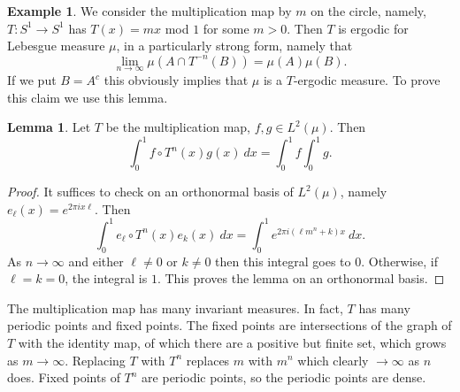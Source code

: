 \documentclass[12pt]{report}
\theoremstyle{definition}
\newtheorem{lemma}[theorem]{Lemma}
\newtheorem{example}[theorem]{Example}
\begin{document}
\begin{example}
We consider the multiplication map by $m$ on the circle, namely, $T: S^1 \to S^1$ has $T(x) = mx$ mod $1$ for some $m > 0$. Then $T$ is ergodic for Lebesgue measure $\mu$, in a particularly strong form, namely that
$$\lim_{n \to \infty} \mu(A \cap T^{-n}(B)) = \mu(A) \mu(B).$$
If we put $B = A^c$ this obviously implies that $\mu$ is a $T$-ergodic measure. To prove this claim we use this lemma.
\begin{lemma}
Let $T$ be the multiplication map, $f,g \in L^2(\mu)$. Then
$$\int_0^1 f \circ T^n(x) g(x) ~dx = \int_0^1f \int_0^1 g.$$
\end{lemma}
\begin{proof}
It suffices to check on an orthonormal basis of $L^2(\mu)$, namely $e_\ell(x) = e^{2\pi ix\ell}$. Then
$$\int_0^1 e_\ell \circ T^n(x) e_k(x) ~dx = \int_0^1 e^{2\pi i(\ell m^n + k)x} ~dx.$$
As $n \to \infty$ and either $\ell \neq 0$ or $k \neq 0$ then this integral goes to $0$. Otherwise, if $\ell = k = 0$, the integral is $1$. This proves the lemma on an orthonormal basis.
\end{proof}
The multiplication map has many invariant measures. In fact, $T$ has many periodic points and fixed points. The fixed points are intersections of the graph of $T$ with the identity map, of which there are a positive but finite set, which grows as $m \to \infty$. Replacing $T$ with $T^n$ replaces $m$ with $m^n$ which clearly $\to \infty$ as $n$ does. Fixed points of $T^n$ are periodic points, so the periodic points are dense.
\end{example}
\end{document}
